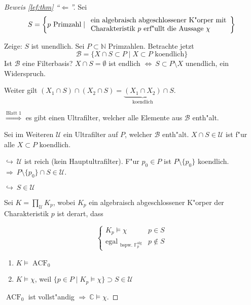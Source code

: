 \documentclass[a4paper,12pt,numbers=noenddot,parskip=full]{scrartcl}
\newcommand{\setN}{\mathbb{N}}
\newcommand{\setC}{\mathbb{C}}
\newcommand{\scrB}{\mathcal{B}}
\newcommand{\scrU}{\mathcal{U}}
\DeclareMathOperator{\acf}{ACF}
\theoremstyle{dotless}
\begin{document}
\begin{proof}[Beweis  \eqref{lef:thm} "`$\Leftarrow$"']
	Sei
	\begin{align*}
		S= \left\{p \text{ Primzahl}\mid 
		\begin{array}{l l}
		\text{ein algebraisch abgeschlossener K"orper mit}\\ 
		\text{Charakteristik } p\text{ erf"ullt die Aussage } \chi  \end{array}\right\}
	\end{align*}
	
	Zeige: $S$ ist unendlich. Sei $P \subset \setN$ Primzahlen. Betrachte jetzt
	\begin{equation}
		\scrB = \{X \cap S \subset P \mid X \subset P \text{ koendlich} \}
	\end{equation}
	Ist $\scrB$ eine Filterbasis? $X \cap S = \emptyset$ ist endlich $\Longleftrightarrow~ S \subset P \setminus X$ unendlich, ein Widerspruch.
	
	Weiter gilt $(X_1 \cap S) \cap (X_2 \cap S) = \underbrace{(X_1 \cap X_2)}_\text{koendlich} \cap S$.
	
	$\overset{\text{Blatt 1}}{\Rightarrow}$ es gibt einen Ultrafilter, welcher alle Elemente aus $\scrB$ enth"alt.
	
	Sei im Weiteren $\scrU$ ein Ultrafilter auf $P$, welcher $\scrB$ enth"alt. $X \cap S \in \scrU$ ist f"ur alle $X \subset P$ koendlich.
	
	$\hookrightarrow~ \scrU$ ist reich (kein Hauptultrafilter). F"ur $p_0 \in P$ ist $P \setminus \{p_0\}$ koendlich. \\$\Rightarrow~P \setminus \{p_0\} \cap S \in \scrU$.
	
	$\hookrightarrow~ S \in \scrU$
	
	Sei $K= \prod\limits_{\scrU} K_p$, wobei $K_p$ ein algebraisch abgeschlossener K"orper der Charakteristik $p$ ist derart, dass
	
	\begin{equation*}
		\begin{cases}
			K_p \models \chi &p \in S\\
			\text{egal }_{\text{bspw. } \mathbb{F}_p^{\text{alg}}} &p \notin S
		\end{cases}	
	\end{equation*}
	\begin{enumerate}
		\item $K \models \acf_0$
		\item $K \models \chi$, weil $\{p \in P \mid K_p \models \chi \} \supset S \in \scrU$
	\end{enumerate}
	$\acf_0$ ist vollst"andig $\Rightarrow~ \setC \models \chi$.
\end{proof}
\end{document}
